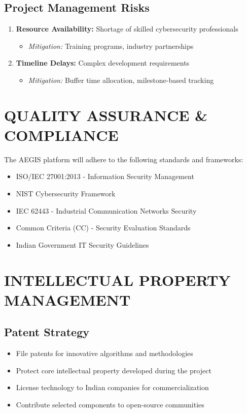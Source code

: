 \documentclass[12pt,a4paper]{article}
\begin{document}
\subsection{Project Management Risks}
\begin{enumerate}
\item \textbf{Resource Availability:} Shortage of skilled cybersecurity professionals
   \begin{itemize}
   \item \textit{Mitigation:} Training programs, industry partnerships
   \end{itemize}

\item \textbf{Timeline Delays:} Complex development requirements
   \begin{itemize}
   \item \textit{Mitigation:} Buffer time allocation, milestone-based tracking
   \end{itemize}
\end{enumerate}

\section{QUALITY ASSURANCE \& COMPLIANCE}

The AEGIS platform will adhere to the following standards and frameworks:

\begin{itemize}
\item ISO/IEC 27001:2013 - Information Security Management
\item NIST Cybersecurity Framework
\item IEC 62443 - Industrial Communication Networks Security
\item Common Criteria (CC) - Security Evaluation Standards
\item Indian Government IT Security Guidelines
\end{itemize}

\section{INTELLECTUAL PROPERTY MANAGEMENT}

\subsection{Patent Strategy}
\begin{itemize}
\item File patents for innovative algorithms and methodologies
\item Protect core intellectual property developed during the project
\item License technology to Indian companies for commercialization
\item Contribute selected components to open-source communities
\end{itemize}
\end{document}
